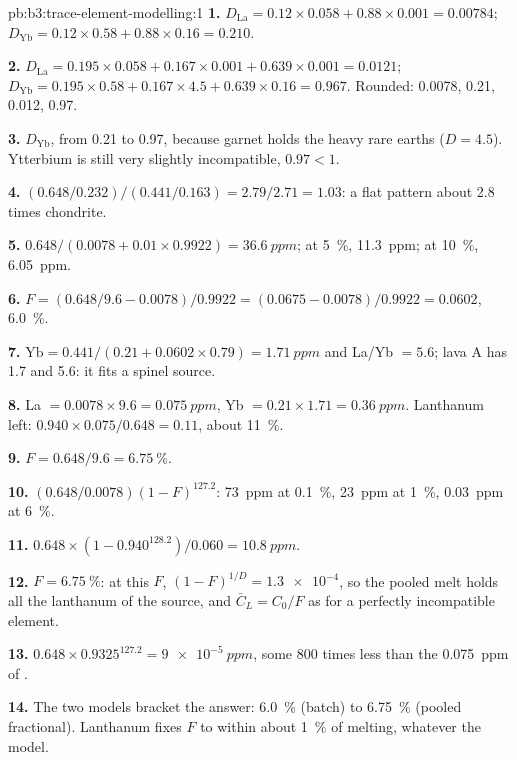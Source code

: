 \begin{solution}{pb:b3:trace-element-modelling:1}
\textbf{1.} $D_{\mathrm{La}} = 0.12\times0.058 + 0.88\times0.001 = 0.00784$;
$D_{\mathrm{Yb}} = 0.12\times0.58 + 0.88\times0.16 = 0.210$.

\textbf{2.} $D_{\mathrm{La}} = 0.195\times0.058 + 0.167\times0.001 +
0.639\times0.001 = 0.0121$; $D_{\mathrm{Yb}} = 0.195\times0.58 +
0.167\times4.5 + 0.639\times0.16 = 0.967$. Rounded: 0.0078, 0.21, 0.012, 0.97.

\textbf{3.} $D_{\mathrm{Yb}}$, from 0.21 to 0.97, because garnet holds the
heavy rare earths ($D = 4.5$). Ytterbium is still very slightly incompatible,
$0.97 < 1$.

\textbf{4.} $(0.648/0.232)/(0.441/0.163) = 2.79/2.71 = 1.03$: a flat pattern
about 2.8 times chondrite.

\textbf{5.} $0.648/(0.0078 + 0.01\times0.9922) = \qty{36.6}{ppm}$; at
\qty{5}{\percent}, \qty{11.3}{ppm}; at \qty{10}{\percent}, \qty{6.05}{ppm}.

\textbf{6.} $F = (0.648/9.6 - 0.0078)/0.9922 = (0.0675 - 0.0078)/0.9922 =
0.0602$, \qty{6.0}{\percent}.

\textbf{7.} $\mathrm{Yb} = 0.441/(0.21 + 0.0602\times0.79) = \qty{1.71}{ppm}$
and La/Yb $= 5.6$; lava A has 1.7 and 5.6: it fits a spinel source.

\textbf{8.} La $= 0.0078\times9.6 = \qty{0.075}{ppm}$, Yb $= 0.21\times1.71 =
\qty{0.36}{ppm}$. Lanthanum left: $0.940\times0.075/0.648 = 0.11$, about
\qty{11}{\percent}.

\textbf{9.} $F = 0.648/9.6 = \qty{6.75}{\percent}$.

\textbf{10.} $(0.648/0.0078)(1 - F)^{127.2}$: \qty{73}{ppm} at
\qty{0.1}{\percent}, \qty{23}{ppm} at \qty{1}{\percent}, \qty{0.03}{ppm} at
\qty{6}{\percent}.

\textbf{11.} $0.648\times(1 - 0.940^{128.2})/0.060 = \qty{10.8}{ppm}$.

\textbf{12.} $F = \qty{6.75}{\percent}$: at this $F$, $(1 - F)^{1/D} =
\num{1.3e-4}$, so the pooled melt holds all the lanthanum of the source, and
$\bar C_L = C_0/F$ as for a perfectly incompatible element.

\textbf{13.} $0.648\times0.9325^{127.2} = \qty{9e-5}{ppm}$, some 800 times
less than the \qty{0.075}{ppm} of .

\textbf{14.} The two models bracket the answer: \qty{6.0}{\percent} (batch)
to \qty{6.75}{\percent} (pooled fractional). Lanthanum fixes $F$ to within
about \qty{1}{\percent} of melting, whatever the model.


\end{solution}
